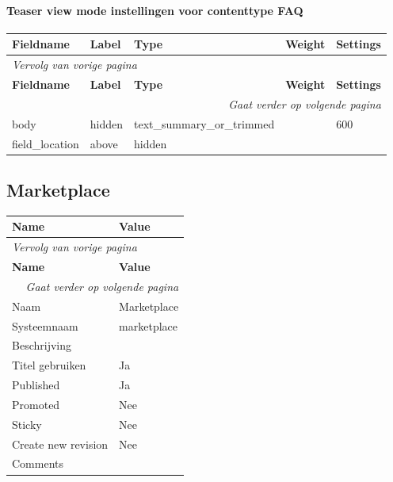 \paragraph{Teaser view mode instellingen voor contenttype FAQ }

  \begin{longtable}{| p{3.00cm}|p{3.00cm}|p{3.00cm}|p{3.00cm}|p{3.00cm}|}
  \hline
  \rowcolor{tableheader}
  \textbf{Fieldname} & \textbf{Label} & \textbf{Type} & \textbf{Weight} & \textbf{Settings}  \tabularnewline
  \hline
\endfirsthead
\multicolumn{5}{l}{\textit{Vervolg van vorige pagina}} \\
\hline
\rowcolor{tableheader}
  \textbf{Fieldname} & \textbf{Label} & \textbf{Type} & \textbf{Weight} & \textbf{Settings}  \tabularnewline
  \hline
\hline
\endhead
\multicolumn{5}{r}{\textit{Gaat verder op volgende pagina}} \\
\endfoot
\hline
\endlastfoot
  body & hidden & text\_summary\_or\_trimmed &   & 600  \tabularnewline
  \hline
  field\_location & above & hidden &   &    \tabularnewline
  \hline
  \end{longtable}

\subsection{Marketplace}
\label{sec:content-marketplace}
  \begin{longtable}{| p{7.50cm}|p{7.50cm}|}
  \hline
  \rowcolor{tableheader}
  \textbf{Name} & \textbf{Value}  \tabularnewline
  \hline
\endfirsthead
\multicolumn{2}{l}{\textit{Vervolg van vorige pagina}} \\
\hline
\rowcolor{tableheader}
  \textbf{Name} & \textbf{Value}  \tabularnewline
  \hline
\hline
\endhead
\multicolumn{2}{r}{\textit{Gaat verder op volgende pagina}} \\
\endfoot
\hline
\endlastfoot
  Naam & Marketplace  \tabularnewline
  \hline
  Systeemnaam & marketplace  \tabularnewline
  \hline
  Beschrijving &   \tabularnewline
  \hline
  Titel gebruiken & Ja  \tabularnewline
  \hline
  Published & Ja  \tabularnewline
  \hline
  Promoted & Nee  \tabularnewline
  \hline
  Sticky & Nee  \tabularnewline
  \hline
  Create new revision & Nee  \tabularnewline
  \hline
  Comments &   \tabularnewline
  \hline
  \end{longtable}

